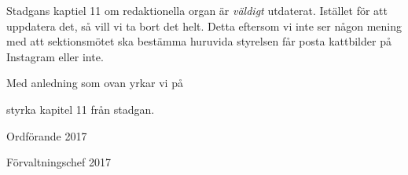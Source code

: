 \documentclass[../_main/handlingar.tex]{subfiles}
\begin{document}

Stadgans kaptiel 11 om redaktionella organ är \emph{väldigt} utdaterat. Istället för att uppdatera det, så vill vi ta bort det helt. Detta eftersom vi inte ser någon mening med att sektionsmötet ska bestämma huruvida styrelsen får posta kattbilder på Instagram eller inte.

Med anledning som ovan yrkar vi på
\begin{attsatser}
    \att styrka kapitel 11 från stadgan.
\end{attsatser}

\begin{signatures}{2}
    \mvh
    \signature{Erik Månsson}{Ordförande 2017}
    \signature{Sophia Grimmeiss Grahm}{Förvaltningschef 2017}
\end{signatures}
\end{document}
